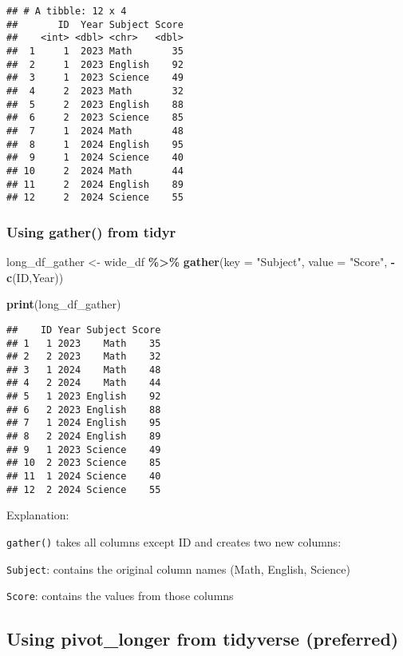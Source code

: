 \documentclass[
]{article}
\newenvironment{Shaded}{\begin{snugshade}}{\end{snugshade}}
\newcommand{\AttributeTok}[1]{\textcolor[rgb]{0.13,0.29,0.53}{#1}}
\newcommand{\FunctionTok}[1]{\textcolor[rgb]{0.13,0.29,0.53}{\textbf{#1}}}
\newcommand{\NormalTok}[1]{#1}
\newcommand{\OtherTok}[1]{\textcolor[rgb]{0.56,0.35,0.01}{#1}}
\newcommand{\SpecialCharTok}[1]{\textcolor[rgb]{0.81,0.36,0.00}{\textbf{#1}}}
\newcommand{\StringTok}[1]{\textcolor[rgb]{0.31,0.60,0.02}{#1}}
\begin{document}
\begin{verbatim}
## # A tibble: 12 x 4
##       ID  Year Subject Score
##    <int> <dbl> <chr>   <dbl>
##  1     1  2023 Math       35
##  2     1  2023 English    92
##  3     1  2023 Science    49
##  4     2  2023 Math       32
##  5     2  2023 English    88
##  6     2  2023 Science    85
##  7     1  2024 Math       48
##  8     1  2024 English    95
##  9     1  2024 Science    40
## 10     2  2024 Math       44
## 11     2  2024 English    89
## 12     2  2024 Science    55
\end{verbatim}

\hypertarget{using-gather-from-tidyr}{%
\subsubsection{Using gather() from
tidyr}\label{using-gather-from-tidyr}}

\begin{Shaded}
\begin{Highlighting}[]
\NormalTok{long\_df\_gather }\OtherTok{\textless{}{-}}\NormalTok{ wide\_df }\SpecialCharTok{\%\textgreater{}\%}
  \FunctionTok{gather}\NormalTok{(}\AttributeTok{key =} \StringTok{"Subject"}\NormalTok{, }\AttributeTok{value =} \StringTok{"Score"}\NormalTok{, }\SpecialCharTok{{-}}\FunctionTok{c}\NormalTok{(ID,Year))}

\FunctionTok{print}\NormalTok{(long\_df\_gather)}
\end{Highlighting}
\end{Shaded}

\begin{verbatim}
##    ID Year Subject Score
## 1   1 2023    Math    35
## 2   2 2023    Math    32
## 3   1 2024    Math    48
## 4   2 2024    Math    44
## 5   1 2023 English    92
## 6   2 2023 English    88
## 7   1 2024 English    95
## 8   2 2024 English    89
## 9   1 2023 Science    49
## 10  2 2023 Science    85
## 11  1 2024 Science    40
## 12  2 2024 Science    55
\end{verbatim}

Explanation:

\texttt{gather()} takes all columns except ID and creates two new
columns:

\texttt{Subject}: contains the original column names (Math, English,
Science)

\texttt{Score}: contains the values from those columns

\hypertarget{using-pivot_longer-from-tidyverse-preferred}{%
\subsection{Using pivot\_longer from tidyverse
(preferred)}\label{using-pivot_longer-from-tidyverse-preferred}}
\end{document}
